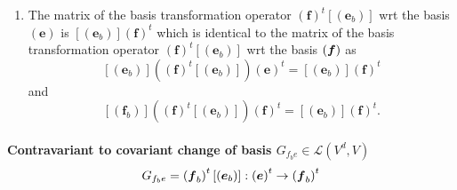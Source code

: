 \documentclass[aps,preprint]{revtex4}
\begin{document}
\begin{enumerate}
\begin{enumerate}
\item The matrix of the basis transformation operator $\left( \boldsymbol{f}%
\right) ^{t}\left[ \left( \boldsymbol{e}_{b}\right) \right] $ wrt the basis $%
\left( \boldsymbol{e}\right) $ is $\left[ \left( \boldsymbol{e}_{b}\right) %
\right] \left( \boldsymbol{f}\right) ^{t}$ which is identical to the matrix
of the basis transformation operator $\left( \boldsymbol{f}\right) ^{t}\left[
\left( \boldsymbol{e}_{b}\right) \right] $ wrt the basis $\left( \boldsymbol{%
f}\right) $ as 
\begin{equation}
\left[ \left( \boldsymbol{e}_{b}\right) \right] \left( \overset{}{\left( 
\boldsymbol{f}\right) ^{t}\left[ \left( \boldsymbol{e}_{b}\right) \right] }%
\right) \left( \boldsymbol{e}\right) ^{t}=\left[ \left( \boldsymbol{e}%
_{b}\right) \right] \left( \boldsymbol{f}\right) ^{t}
\end{equation}%
and 
\begin{equation}
\left[ \left( \boldsymbol{f}_{b}\right) \right] \left( \overset{}{\left( 
\boldsymbol{f}\right) ^{t}\left[ \left( \boldsymbol{e}_{b}\right) \right] }%
\right) \left( \boldsymbol{f}\right) ^{t}=\left[ \left( \boldsymbol{e}%
_{b}\right) \right] \left( \boldsymbol{f}\right) ^{t}.
\end{equation}
\end{enumerate}
\end{enumerate}

\paragraph{Contravariant to covariant change of basis $G_{f_{b}e}\in 
\mathcal{L}\left( V^{d},V\right) $ \label{Contravariant to covariant change
of basis} 
\protect\begin{equation}
G_{f_{b}e}=\left( \boldsymbol{f}_{b}\right) ^{t}\left[ \left( \boldsymbol{e}%
_{b}\right) \right] :\left( \boldsymbol{e}\right) ^{t}\rightarrow \left( 
\boldsymbol{f}_{b}\right) ^{t} 
\protect\end{equation}%
}
\end{document}

